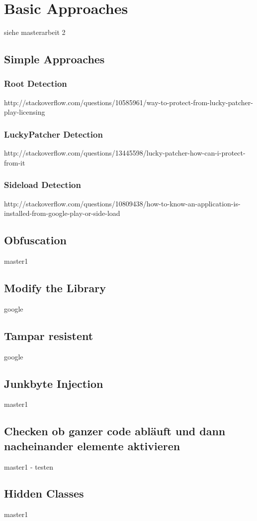\section{Basic Approaches}\label{section:basic}
siehe masterarbeit 2

\subsection{Simple Approaches}\label{subsection:basic-simple}
\subsubsection{Root Detection}\label{subsection:basic-simple-root}
http://stackoverflow.com/questions/10585961/way-to-protect-from-lucky-patcher-play-licensing
\subsubsection{LuckyPatcher Detection}\label{subsection:basic-simple-luckypatcher}
http://stackoverflow.com/questions/13445598/lucky-patcher-how-can-i-protect-from-it
\subsubsection{Sideload Detection}\label{subsection:basic-simple-sideload}
http://stackoverflow.com/questions/10809438/how-to-know-an-application-is-installed-from-google-play-or-side-load

\subsection{Obfuscation}\label{subsection:basic-obfuscation}
master1

\subsection{Modify the Library}\label{subsection:basic-}
google

\subsection{Tampar resistent}\label{subsection:basic-tampar}
google

\subsection{Junkbyte Injection}\label{subsection:basic-junkbyte}
master1

\subsection{Checken ob ganzer code abläuft und dann nacheinander elemente aktivieren}\label{subsection:basic-flow}
master1 - testen

\subsection{Hidden Classes}\label{subsection:basic-hidden}
master1
